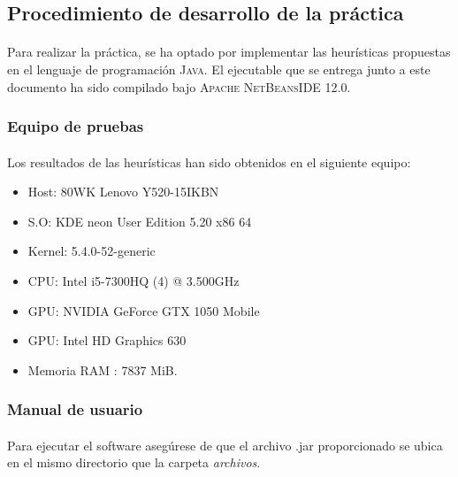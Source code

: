 \documentclass{article}
\begin{document}
	\subsection{Procedimiento de desarrollo de la práctica}
	
	\paragraph{}Para realizar la práctica, se ha optado por implementar las heurísticas propuestas en el lenguaje de programación \textsc{Java}. El ejecutable que se entrega junto a este documento ha sido compilado bajo \textsc{ Apache NetBeansIDE 12.0}.
	
	\subsubsection{Equipo de pruebas}
	
	\paragraph{}Los resultados de las heurísticas han sido obtenidos en el siguiente equipo:
	
		\begin{itemize}
			
			\item Host: 80WK Lenovo Y520-15IKBN
			\item S.O: KDE neon User Edition 5.20 x86 64
			\item Kernel: 5.4.0-52-generic
			\item CPU: Intel i5-7300HQ (4) @ 3.500GHz
			\item GPU: NVIDIA GeForce GTX 1050 Mobile
			\item GPU: Intel HD Graphics 630
			\item Memoria RAM : 7837 MiB.
			
		\end{itemize}

	\subsubsection{Manual de usuario}
	
		\paragraph{}Para ejecutar el software asegúrese de que el archivo .jar proporcionado se ubica en el mismo directorio que la carpeta \emph{archivos}. 
		
\end{document}
